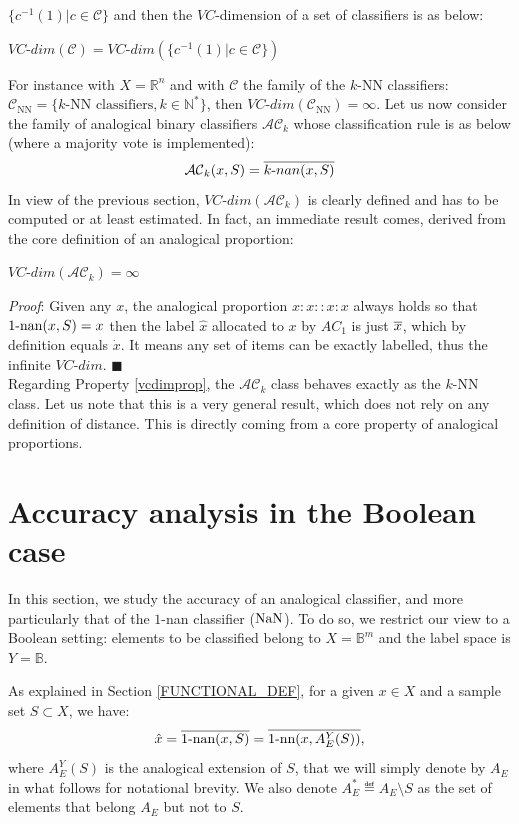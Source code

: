 $\{c^{-1}(1) | c \in \mathcal{C}\}$ and then the $VC\mbox{-}$dimension of a set of classifiers is as below:
\begin{definition}
$VC\mbox{-}dim(\mathcal{C})=VC\mbox{-}dim(\{c^{-1}(1) | c \in \mathcal{C}\})$
\end{definition}
For instance with $X=\mathbb{R}^n$ and with $\mathcal{C}$ the family of the $k$-NN
classifiers: $\mathcal{C}_{\text{NN}}=\{ k\text{-NN classifiers}, k \in \mathbb{N}^*\}$,
then $VC\mbox{-}dim(\mathcal{C}_{\text{NN}})=\infty$.
Let us now consider the family of analogical binary classifiers $\mathcal{AC}_k$ whose classification rule is as below (where a majority vote is implemented):
$$\mathcal{AC}_k(x,S) = \overline{k\mbox{-}nan(x,S)}$$
In view of the previous section, $VC\mbox{-}dim(\mathcal{AC}_k)$ is clearly defined and has to be computed
or at least estimated.
In fact, an immediate result comes, derived from the core definition of an analogical proportion:
\begin{property}\label{vcdimprop}
$VC\mbox{-}dim(\mathcal{AC}_k) = \infty$
\end{property}
{\it Proof}: Given any $x$, the analogical proportion $x:x::x:x$ always
holds so that $1\mbox{-nan}(x,S)=x$ then the label $\hat{x}$ allocated to $x$ by $AC_1$
is just $\overline{x}$, which by definition equals $\dot{x}$. It means any set of items can be
exactly labelled, thus the infinite $VC\mbox{-}dim$.  \hfill $\blacksquare$\\
Regarding Property \ref{vcdimprop}, the $\mathcal{AC}_k$ class
behaves exactly as the $k\mbox{-NN}$ class.
Let us note that this is a very general result, which does not rely on any definition of distance.
This is directly coming from a core property of analogical proportions.

\section{Accuracy analysis in the Boolean case}\label{accuracy}

In this section, we study the accuracy of an analogical classifier, and more
particularly that of the $1$-nan classifier ($\mbox{NaN}$). To do so, we restrict
our view to a Boolean setting: elements to be classified belong to
$X=\mathbb{B}^m$ and the label space is $Y = \mathbb{B}$.

As explained in Section \ref{FUNCTIONAL_DEF}, for a given $x \in X$ and a sample set
$S \subset X$, we have:
\begin{equation}\label{eq1}
\hat{x}=\overline{1\mbox{-nan}(x, S)}=\overline{1\mbox{-nn}(x, A_E^Y(S))},
\end{equation}
where $A_E^Y(S)$ is the analogical extension of $S$, that we will simply denote
by $A_E$ in what follows for notational brevity.  We also denote $A_E^*
\eqdef A_E \setminus S$ as the set of elements that belong $A_E$ but not to
$S$.

